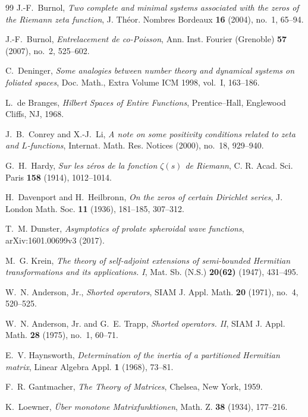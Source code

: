 \documentclass[11pt]{amsart}
\theoremstyle{definition}
\theoremstyle{remark}
\begin{document}
\begin{thebibliography}{99}
J.-F.~Burnol,
\emph{Two complete and minimal systems associated with the zeros of the
Riemann zeta function},
J. Th\'eor. Nombres Bordeaux \textbf{16} (2004), no.~1, 65--94.

J.-F.~Burnol,
\emph{Entrelacement de co-Poisson},
Ann. Inst. Fourier (Grenoble) \textbf{57} (2007), no.~2, 525--602.

C.~Deninger,
\emph{Some analogies between number theory and dynamical systems on
foliated spaces},
Doc. Math., Extra Volume ICM 1998, vol.~I, 163--186.

L.~de Branges,
\emph{Hilbert Spaces of Entire Functions},
Prentice--Hall, Englewood Cliffs, NJ, 1968.

J.~B.~Conrey and X.-J.~Li,
\emph{A note on some positivity conditions related to zeta and
\(L\)-functions},
Internat. Math. Res. Notices (2000), no.~18, 929--940.

G.~H.~Hardy,
\emph{Sur les z\'eros de la fonction \(\zeta(s)\) de Riemann},
C. R. Acad. Sci. Paris \textbf{158} (1914), 1012--1014.

H.~Davenport and H.~Heilbronn,
\emph{On the zeros of certain Dirichlet series},
J. London Math. Soc. \textbf{11} (1936), 181--185, 307--312.

T.~M. Dunster,
\emph{Asymptotics of prolate spheroidal wave functions},
arXiv:1601.00699v3 (2017).

M.~G. Krein,
\emph{The theory of self-adjoint extensions of semi-bounded Hermitian
transformations and its applications. I},
Mat. Sb. (N.S.) \textbf{20(62)} (1947), 431--495.

W.~N. Anderson, Jr.,
\emph{Shorted operators},
SIAM J. Appl. Math. \textbf{20} (1971), no.~4, 520--525.

W.~N. Anderson, Jr. and G.~E. Trapp,
\emph{Shorted operators. II},
SIAM J. Appl. Math. \textbf{28} (1975), no.~1, 60--71.

E.~V. Haynsworth,
\emph{Determination of the inertia of a partitioned Hermitian matrix},
Linear Algebra Appl. \textbf{1} (1968), 73--81.

F.~R. Gantmacher,
\emph{The Theory of Matrices},
Chelsea, New York, 1959.

K.~Loewner,
\emph{\"Uber monotone Matrixfunktionen},
Math. Z. \textbf{38} (1934), 177--216.


\end{thebibliography}
\end{document}
